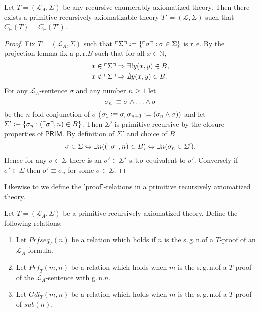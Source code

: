 \begin{thm}
Let $T=(\mathcal{L}_A, \Sigma)$ be any recursive enumerably axiomatized theory. Then there exists a primitive recursively axiomatizable theory $T'=(\mathcal{L}, \Sigma)$ such that $C_\vdash (T) = C_\vdash (T')$.
\end{thm}
\begin{proof}
Fix $T = ( \mathcal{L}_A, \Sigma)$ such that $\ulcorner \Sigma \urcorner \vcentcolon= \lbrace \ulcorner \sigma \urcorner : \sigma \in \Sigma \rbrace$ is r.\,e. By the projection lemma fix a p.\,r.\@ $B$ such that for all $x \in \mathbb{N}$, 
\begin{align*}
& x \in \ulcorner \Sigma \urcorner \Rightarrow \exists !y (x,y) \in B, \\
& x \notin \ulcorner \Sigma \urcorner \Rightarrow \nexists y (x,y) \in B.
\end{align*}
For any $\mathcal{L}_A$-sentence $\sigma$ and any number $n \ge 1$ let 
\[\sigma_n \vcentcolon \equiv \sigma \wedge \ldots \wedge \sigma\] be the $n$-fold conjunction of $\sigma$ ($\sigma_1 \vcentcolon \equiv \sigma, \sigma_{n+1} \vcentcolon= (\sigma_n \wedge \sigma))$ and let $\Sigma' \vcentcolon \equiv \lbrace \sigma_n: ( \ulcorner \sigma \urcorner, n) \in B \rbrace$. Then $\Sigma'$ is primitive recursive by the closure properties of $\mathsf{PRIM}$. By definition of $\Sigma'$ and choice of $B$
\[ \sigma \in \Sigma \Leftrightarrow \exists n ((\ulcorner \sigma\urcorner, n ) \in B) \Leftrightarrow \exists n ( \sigma_n \in \Sigma'). \]
Hence for any $\sigma \in \Sigma$ there is an $\sigma' \in \Sigma'$ s.\,t.\@ $\sigma$ equivalent to $\sigma'$. Conversely if $\sigma' \in \Sigma$ then $\sigma' \equiv \sigma_n$ for some $\sigma \in \Sigma$.
\end{proof}

Likewise to \PA we define the 'proof'-relations in a primitive recursively axiomatized theory.

\begin{dfn}
Let $T = (\mathcal{L}_A, \Sigma)$ be a primitive recursively axiomatized theory. Define the following relations:
\begin{enumerate}
\item Let $\mathit{Prfseq}_T(n)$ be a relation which holds if $n$ is the s.\,g.\,n.\@ of a $T$-proof of an $\mathcal{L}_A$-formula.
\item Let $\mathit{Prf}_T(m,n)$ be a relation which holds when $m$ is the s.\,g.\,n.\@ of a $T$-proof of the $\mathcal{L}_A$-sentence with g.\,n.\@ $n$.
\item Let $\mathit{Gdl_T}(m,n)$ be a relation which holds when $m$ is the s.\,g.\,n.\@ of a $T$-proof of $\mathit{sub}(n)$.
\end{enumerate}
\end{dfn}

